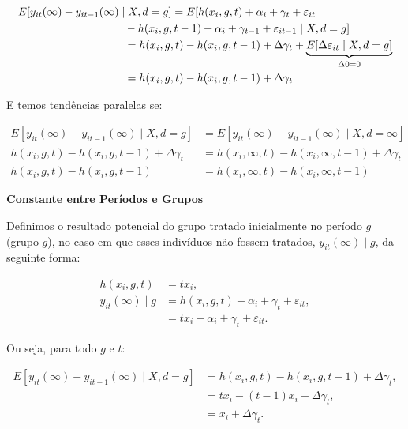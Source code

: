 \documentclass[portugues]{article}
\begin{document}
\begin{box_ex}
\[
\begin{split}
    E[y_{it}(\infty) - y_{it-1}(\infty) \mid X, d = g] &=  E[h(x_i, g, t) + \alpha_i + \gamma_t + \varepsilon_{it} \\
    & \hspace{-15mm} - h(x_i, g, t-1) + \alpha_i + \gamma_{t-1} + \varepsilon_{it-1} \mid X, d = g] \\
    & \hspace{-15mm} = h(x_i, g, t) - h(x_i, g, t-1) + \Delta \gamma_t + \underbrace{E[\Delta \varepsilon_{it} \mid X, d = g]}_{\Delta 0 = 0} \\
    & \hspace{-15mm} =  h(x_i, g, t) - h(x_i, g, t-1) + \Delta \gamma_t 
\end{split}
\]

E temos tendências paralelas se:

\[
\begin{split}
    E[y_{it}(\infty) - y_{it-1}(\infty) \mid X, d = g] &= E[y_{it}(\infty) - y_{it-1}(\infty) \mid X, d = \infty] \\
     h(x_i, g, t) - h(x_i, g, t-1) + \Delta \gamma_t  &= h(x_i, \infty, t) - h(x_i, \infty, t-1) + \Delta \gamma_t \\
     h(x_i, g, t) - h(x_i, g, t-1)  &= h(x_i, \infty, t) - h(x_i, \infty, t-1)
\end{split}
\]

\vspace{2.5mm}

\noindent \textbf{Constante entre Períodos e Grupos}

\vspace{1.5mm}

Definimos o resultado potencial do grupo tratado inicialmente no período $g$ (grupo $g$), no caso em que esses indivíduos não fossem tratados, $y_{it}(\infty) \mid g$, da seguinte forma:

\[
\begin{split}
    h(x_i, g, t) &= t x_i, \\
    y_{it}(\infty) \mid g &= h(x_i, g, t) + \alpha_i + \gamma_t + \varepsilon_{it}, \\
    &= t x_i + \alpha_i + \gamma_t + \varepsilon_{it}.
\end{split}
\]

Ou seja, para todo $g$ e $t$:

\[
\begin{split}
    E[y_{it}(\infty) - y_{it-1}(\infty) \mid X, d = g] &= h(x_i, g, t) - h(x_i, g, t-1) + \Delta \gamma_t, \\
    &= t x_i - (t-1) x_i + \Delta \gamma_t, \\
    &= x_i + \Delta \gamma_t.
\end{split}
\]


\end{box_ex}
\end{document}
